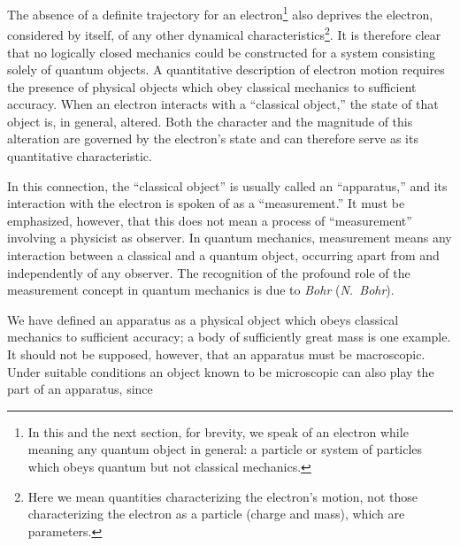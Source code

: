 The absence of a definite trajectory for an electron\footnote{In this and the
next section, for brevity, we speak of an electron while meaning any quantum
object in general: a particle or system of particles which obeys quantum but
not classical mechanics.} also deprives the electron, considered by itself,
of any other dynamical characteristics\footnote{Here we mean quantities
characterizing the electron's motion, not those characterizing the electron
as a particle (charge and mass), which are parameters.}. It is therefore clear
that no logically closed mechanics could be constructed for a system
consisting solely of quantum objects. A quantitative description of electron
motion requires the presence of physical objects which obey classical
mechanics to sufficient accuracy. When an electron interacts with a
``classical object,'' the state of that object is, in general, altered. Both the character
and the magnitude of this alteration are governed by the electron's state and can therefore
serve as its quantitative characteristic.

In this connection, the ``classical object'' is usually called an
``apparatus,'' and its interaction with the electron is spoken of as a
``measurement.'' It must be emphasized, however, that this does not mean a
process of ``measurement'' involving a physicist as observer. In quantum
mechanics, measurement means any interaction between a classical and a
quantum object, occurring apart from and independently of any observer. The
recognition of the profound role of the measurement concept in quantum
mechanics is due to \emph{Bohr} (\emph{N.~Bohr}).

We have defined an apparatus as a physical object which obeys classical
mechanics to sufficient accuracy; a body of sufficiently great mass is one
example. It should not be supposed, however, that an apparatus must be
macroscopic. Under suitable conditions an object known to be microscopic can
also play the part of an apparatus, since%
